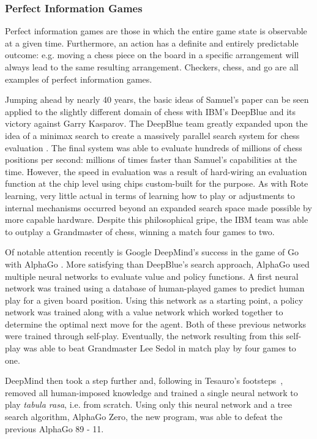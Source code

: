 

\subsubsection{Perfect Information Games}

Perfect information games are those in which the entire game state is observable
at a given time.
%
Furthermore,
an action has a definite and entirely predictable outcome:
e.g. moving a chess piece on the board in a specific arrangement will always
lead to the same resulting arrangement.
%
Checkers, chess, and go are all examples of perfect information games.

Jumping ahead by nearly 40 years,
the basic ideas of Samuel's paper can be seen applied to the slightly different
domain of chess with IBM's DeepBlue
and its victory against Garry Kasparov.
%
The DeepBlue team greatly expanded upon the idea of a minimax search to create a
massively parallel search system for chess evaluation
\cite{ibm_deepblue}.
%
The final system was able to evaluate hundreds of millions of chess positions
per second:
millions of times faster than Samuel's capabilities at the time.
%
However,
the speed in evaluation was a result of hard-wiring an evaluation function at
the chip level using chips custom-built for the purpose.
%
As with Rote learning,
very little actual in terms of learning how to play or adjustments to internal
mechanisms occurred
beyond an expanded search space made possible by more capable hardware.
%
Despite this philosophical gripe,
the IBM team was able to outplay a Grandmaster of chess,
winning a match four games to two.


Of notable attention recently is Google DeepMind's
success in the game of Go with AlphaGo
\cite{deepmind_alphago}.
%
More satisfying than DeepBlue's search approach,
AlphaGo used multiple neural networks to evaluate value and policy functions.
%
A first neural network was trained using a database of human-played games
to predict human play for a given board position.
%
Using this network as a starting point,
a policy network was trained
along with a value network which worked together to determine the optimal next
move for the agent.
%
Both of these previous networks were trained through self-play.
%
Eventually,
the network resulting from this self-play was able to beat Grandmaster Lee Sedol
in match play by four games to one.


DeepMind then took a step further and,
following in Tesauro's footsteps~\cite{tdgammon},
removed all human-imposed knowledge and
trained a single neural network to play \textit{tabula rasa}, i.e. from scratch.
%
Using only this neural network and a tree search algorithm,
AlphaGo Zero, the new program,
was able to defeat the previous AlphaGo 89 - 11.


